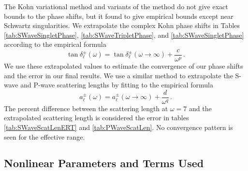 \documentclass[preprint,showpacs,showkeys,preprintnumbers,amsmath,amssymb,longbibliography,pra,aps]{revtex4-1}
\begin{document}
The Kohn variational method and variants of the method do not give exact
bounds to the phase shifts, but it found to give empirical bounds except
near Schwartz singularities. We extrapolate the complex Kohn phase shifts
in Tables \ref{tab:SWaveSingletPhase}, \ref{tab:SWaveTripletPhase}, and
\ref{tab:SWaveSingletPhase} according to the empirical formula
\cite{Armour1991,VanReeth2003}
\begin{equation}
\label{eq:Extrap}
\tan\delta_\ell^\pm(\omega) = \tan\delta_\ell^\pm(\omega\to\infty) +
  \frac{c}{\omega^p}\, .
\end{equation}
We use these extrapolated values to estimate the convergence of our phase 
shifts and the error in our final results. We use a similar method to
extrapolate the S-wave and P-wave scattering lengths by fitting to the
empirical formula \cite{VanReeth2003}
\begin{equation}
\label{eq:ExtrapA}
a_\ell^\pm(\omega) = a_\ell^\pm(\omega\to\infty) + \frac{d}{\omega^q}\, .
\end{equation}
The percent difference between the scattering length at $\omega = 7$
and the extrapolated scattering 
length is considered the error in tables \ref{tab:SWaveScatLenERT} and
\ref{tab:PWaveScatLen}. No convergence pattern is seen for the effective range.

\subsection{Nonlinear Parameters and Terms Used}
\label{sec:Parameters}
\end{document}
